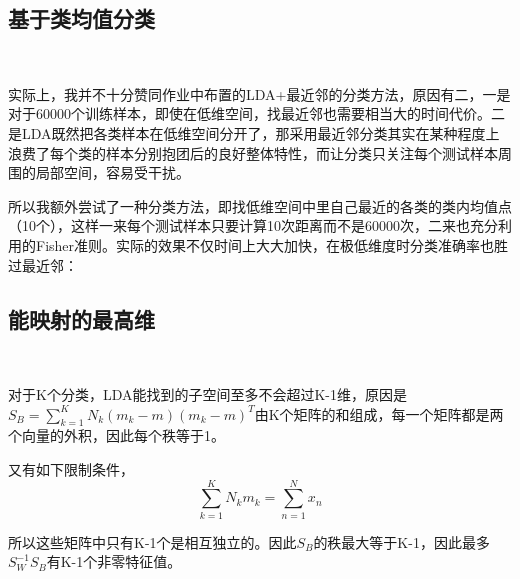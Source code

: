 \documentclass[hyperref,UTF8]{ctexart}
\begin{document}
\subsection*{基于类均值分类}\
\par 实际上，我并不十分赞同作业中布置的LDA+最近邻的分类方法，原因有二，一是对于60000个训练样本，即使在低维空间，找最近邻也需要相当大的时间代价。二是LDA既然把各类样本在低维空间分开了，那采用最近邻分类其实在某种程度上浪费了每个类的样本分别抱团后的良好整体特性，而让分类只关注每个测试样本周围的局部空间，容易受干扰。
\par 所以我额外尝试了一种分类方法，即找低维空间中里自己最近的各类的类内均值点（10个），这样一来每个测试样本只要计算10次距离而不是60000次，二来也充分利用的Fisher准则。实际的效果不仅时间上大大加快，在极低维度时分类准确率也胜过最近邻：
\begin{table}[!htbp]
  \centering
\caption{LDA基于最近均值点分类}
\label{tb:lda_knn}
\end{table}

\subsection*{能映射的最高维}\
\par 对于K个分类，LDA能找到的子空间至多不会超过K-1维，原因是$S_B=\sum_{k=1}^{K}N_k(m_k-m)(m_k-m)^T$由K个矩阵的和组成，每一个矩阵都是两个向量的外积，因此每个秩等于1。
\par 又有如下限制条件，
\[\sum_{k=1}^{K}N_km_k=\sum_{n=1}^{N}x_n\]
\par 所以这些矩阵中只有K-1个是相互独立的。因此$S_B$的秩最大等于K-1，因此最多$S_{W}^{-1}S_B$有K-1个非零特征值。
\end{document}
